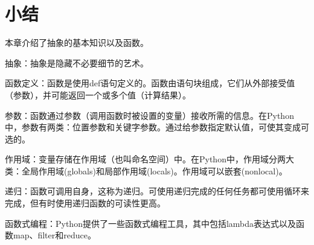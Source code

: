 \section{小结}
本章介绍了抽象的基本知识以及函数。
\begin{dinglist}{43}
    \item 抽象：抽象是隐藏不必要细节的艺术。
    \item 函数定义：函数是使用def语句定义的。函数由语句块组成，它们从外部接受值（参数），并可能返回一个或多个值（计算结果）。
    \item 参数：函数通过参数（调用函数时被设置的变量）接收所需的信息。在Python中，参数有两类：位置参数和关键字参数。通过给参数指定默认值，可使其变成可选的。
    \item 作用域：变量存储在作用域（也叫命名空间）中。在Python中，作用域分两大类：全局作用域(globals)和局部作用域(locals)。作用域可以嵌套(nonlocal)。
    \item 递归：函数可调用自身，这称为递归。可使用递归完成的任何任务都可使用循环来完成，但有时使用递归函数的可读性更高。
    \item 函数式编程：Python提供了一些函数式编程工具，其中包括lambda表达式以及函数map、filter和reduce。
\end{dinglist}
